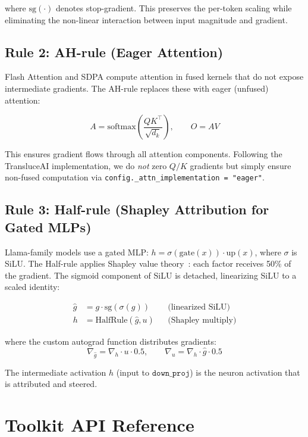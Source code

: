 \documentclass[11pt]{article}
\begin{document}
where $\text{sg}(\cdot)$ denotes stop-gradient.
This preserves the per-token scaling while eliminating the non-linear interaction between input magnitude and gradient.

\subsection{Rule 2: AH-rule (Eager Attention)}

Flash Attention and SDPA compute attention in fused kernels that do not expose intermediate gradients.
The AH-rule replaces these with eager (unfused) attention:

\begin{equation}
    A = \text{softmax}\left(\frac{QK^\top}{\sqrt{d_k}}\right), \qquad O = AV
\end{equation}

This ensures gradient flows through all attention components.
Following the TransluceAI implementation, we do \emph{not} zero $Q/K$ gradients but simply ensure non-fused computation via \texttt{config.\_attn\_implementation = "eager"}.

\subsection{Rule 3: Half-rule (Shapley Attribution for Gated MLPs)}

Llama-family models use a gated MLP: $h = \sigma(\text{gate}(x)) \cdot \text{up}(x)$, where $\sigma$ is SiLU.
The Half-rule applies Shapley value theory~\citep{shapley1953value}: each factor receives 50\% of the gradient.
The sigmoid component of SiLU is detached, linearizing SiLU to a scaled identity:

\begin{align}
    \hat{g} &= g \cdot \text{sg}(\sigma(g))  && \text{(linearized SiLU)} \\
    h &= \text{HalfRule}(\hat{g}, u) && \text{(Shapley multiply)}
\end{align}

where the custom autograd function distributes gradients:
\begin{equation}
    \nabla_{\hat{g}} = \nabla_h \cdot u \cdot 0.5, \qquad \nabla_u = \nabla_h \cdot \hat{g} \cdot 0.5
\end{equation}

The intermediate activation $h$ (input to $\texttt{down\_proj}$) is the neuron activation that is attributed and steered.


\section{Toolkit API Reference}
\label{sec:api}
\end{document}
